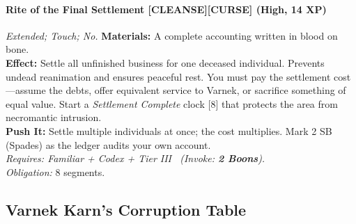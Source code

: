 \paragraph{Rite of the Final Settlement \textnormal{[CLEANSE][CURSE]} (High, 14 XP)} \emph{Extended; Touch; No.}
\textbf{Materials:} A complete accounting written in blood on bone.\\
\textbf{Effect:} Settle all unfinished business for one deceased individual. Prevents undead reanimation and ensures peaceful rest. You must pay the settlement cost—assume the debts, offer equivalent service to Varnek, or sacrifice something of equal value. Start a \emph{Settlement Complete} clock [8] that protects the area from necromantic intrusion.\\
\textbf{Push It:} Settle multiple individuals at once; the cost multiplies. Mark 2 SB (Spades) as the ledger audits your own account.\\
\emph{Requires: Familiar + Codex + Tier III \ (\textit{Invoke:} \textbf{2 Boons}).}\\
\emph{Obligation:} 8 segments.

\subsection*{Varnek Karn's Corruption Table}
\label{sec:varnek-karn-corruption}

